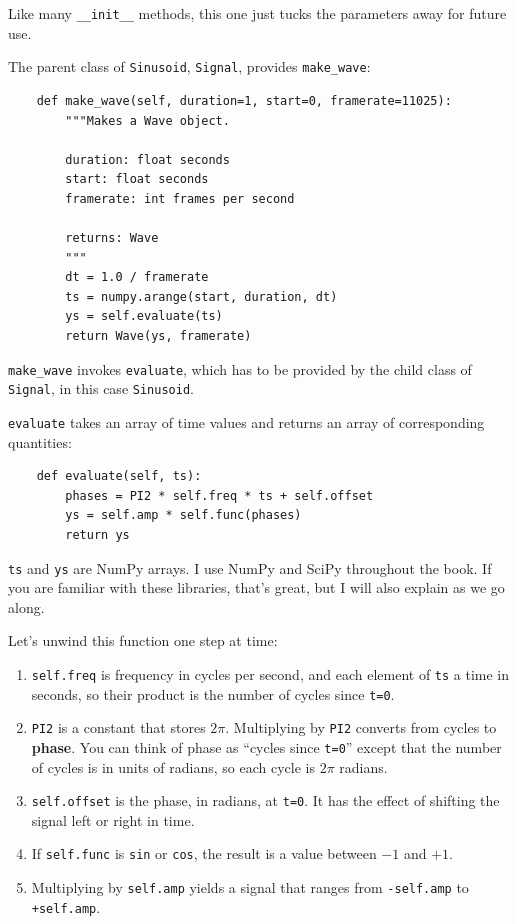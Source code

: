 \documentclass[12pt]{book}
\begin{document}
Like many \verb"__init__" methods, this one just tucks the
parameters away for future use.

The parent class of {\tt Sinusoid}, {\tt Signal}, provides \verb"make_wave":

\begin{verbatim}
    def make_wave(self, duration=1, start=0, framerate=11025):
        """Makes a Wave object.

        duration: float seconds
        start: float seconds
        framerate: int frames per second

        returns: Wave
        """
        dt = 1.0 / framerate
        ts = numpy.arange(start, duration, dt)
        ys = self.evaluate(ts)
        return Wave(ys, framerate)
\end{verbatim}

\verb"make_wave" invokes {\tt evaluate}, which has to be provided
by the child class of {\tt Signal}, in this case {\tt Sinusoid}.

{\tt evaluate} takes an array of time values and returns an array of
corresponding quantities:

\begin{verbatim}
    def evaluate(self, ts):
        phases = PI2 * self.freq * ts + self.offset
        ys = self.amp * self.func(phases)
        return ys
\end{verbatim}

{\tt ts} and {\tt ys} are NumPy arrays.  I use NumPy and SciPy
throughout the book.  If you are familiar with these libraries,
that's great, but I will also explain as we go along.

Let's unwind this function one step at time:

\begin{enumerate}

\item {\tt self.freq} is frequency in cycles per second, and
each element of {\tt ts} a time in seconds, so their product is
the number of cycles since {\tt t=0}.

\item {\tt PI2} is a constant that stores $2 \pi$.  Multiplying
by {\tt PI2} converts from cycles to {\bf phase}.  You can
think of phase as ``cycles since {\tt t=0}'' except that the number
of cycles is in units of radians, so each cycle is $2 \pi$ radians.

\item {\tt self.offset} is the phase, in radians, at {\tt t=0}.  It has
the effect of shifting the signal left or right in time.

\item If {\tt self.func} is {\tt sin} or {\tt cos}, the result is
a value between $-1$ and $+1$.

\item Multiplying by {\tt self.amp} yields a signal that ranges
from {\tt -self.amp} to {\tt +self.amp}.

\end{enumerate}
\end{document}
